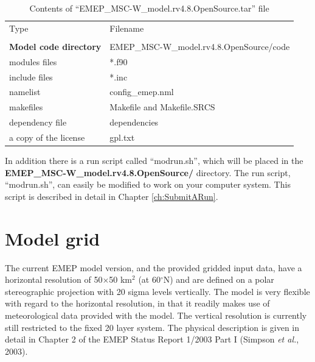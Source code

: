 \begin{table}[h]
\begin{center}
\caption{Contents of ``EMEP\_MSC-W\_model.rv4.8.OpenSource.tar'' file
   \label{Tab:modelfiles}}
\begin{tabular}{ll}
& \\
\hline
Type      & Filename          \\
\hline
& \\
{\bf Model code directory} & EMEP\_MSC-W\_model.rv4.8.OpenSource/code \\ 
\hline
modules files & *.f90 \\
include files & *.inc \\
namelist & config\_emep.nml \\
makefiles & Makefile and Makefile.SRCS \\
dependency file &  dependencies\\
a copy of the license & gpl.txt \\
\hline
\end{tabular}
\end{center}
\end{table}

In addition there is a run script called ``modrun.sh'', which will be placed 
in the \\{\bf EMEP\_MSC-W\_model.rv4.8.OpenSource/}  directory. The run 
script, ``modrun.sh'', can easily be modified to work on your computer system. 
This script is described in detail in Chapter \ref{ch:SubmitARun}. 
 


\section{Model grid}
\label{sec:ModelGrid}

The current EMEP model version, and the provided gridded input data,
have a horizontal resolution of 50$\times$50 km$^2$ (at 60$^\circ$N)
and are defined on a
polar stereographic projection with 20 sigma levels vertically. 
The model is very flexible with regard to the horizontal
resolution, in that it readily makes use of 
meteorological data provided with the model. The vertical
resolution is currently still restricted to the fixed 20 layer
system. The physical
description is given in detail in Chapter 2 of the EMEP Status Report
1/2003 Part I (Simpson {\sl et al.}, 2003).

